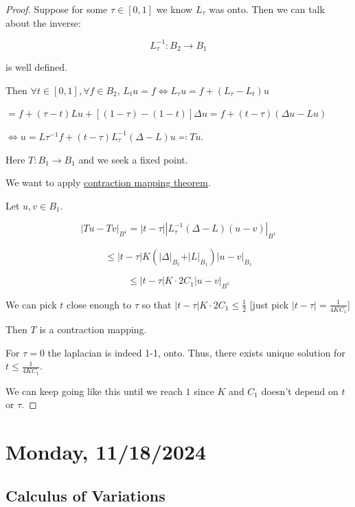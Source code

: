 \documentclass{article}
\theoremstyle{definition}
\begin{document}
\begin{proof}
    Suppose for some \(\tau \in [0,1]\) we know \(L_{\tau} \) was onto. Then we can talk about the inverse:

    \[
        L_{\tau} ^{-1} : B_2 \to B_1
    \]

    is well defined.

    Then \(\forall t \in [0,1], \forall f\in B_2\), \(L_t u = f \iff L_{\tau} u = f + (L_{\tau} - L_t)u \) 

    \(= f + (\tau-t)Lu + [(1-\tau)-(1-t)]\Delta u = f + (t-\tau)(\Delta u - Lu)\)
    
    \(\iff u = L \tau ^{-1} f + (t-\tau) L_{\tau}^{-1} (\Delta - L) u \eqqcolon Tu\).

    Here \(T: B_1 \to B_1\) and we seek a fixed point.
    
    We want to apply \underline{contraction mapping theorem}.
    
    Let \(u,v\in B_1\).

    \[
        \left\vert Tu - Tv \right\vert _{B^1} =\vert t - \tau \vert \left\vert L_{\tau} ^{-1} (\Delta  - L)(u-v) \right\vert _{B^1}
    \]

    \[
        \leq \vert t-\tau \vert K \left( \vert \Delta \vert_{B_1} + \vert L \vert_{B_1} \right) \vert u-v \vert_{B_1} 
    \]

    \[
        \leq \vert t - \tau \vert K \cdot 2 C_1 \vert u-v \vert_{B^1}
    \]

    We can pick \(t\) close enough to \(\tau \) so that \(\vert t-\tau \vert K \cdot 2C_1 \leq \frac{1}{2}\) [just pick \(\vert t-\tau \vert = \frac{1}{4KC_1}\)]

    Then \(T\) is a contraction mapping. 

    For \(\tau = 0\) the laplacian is indeed 1-1, onto. Thus, there exists unique solution for \(t \leq \frac{1}{4KC_1}\).
    
    We can keep going like this until we reach \(1\) since \(K\) and \(C_1\) doesn't depend on \(t\) or \(\tau\).

\end{proof}

\section*{Monday, 11/18/2024}

\subsection*{Calculus of Variations}
\end{document}
